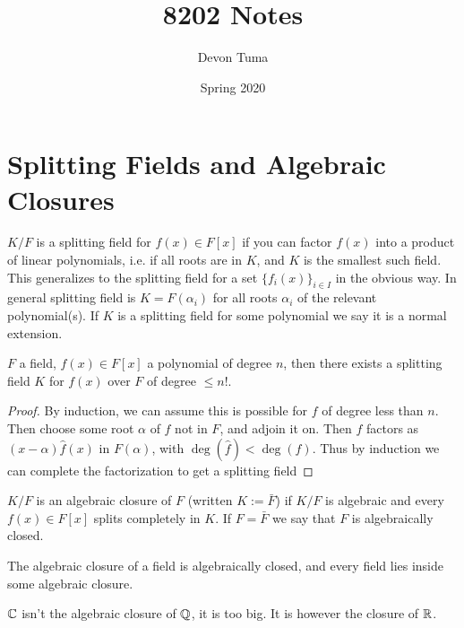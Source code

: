 \documentclass[11pt]{article}
\title{8202 Notes}
\author{Devon Tuma}
\date{Spring 2020}
\begin{document}
\maketitle

\section*{Splitting Fields and Algebraic Closures}

\begin{definition}
  $K/F$ is a splitting field for $f(x) \in F[x]$ if you can factor $f(x)$ into a product of linear polynomials, i.e. if all roots are in $K$, and $K$ is the smallest such field.
  This generalizes to the splitting field for a set $\{f_i(x)\}_{i \in I}$ in the obvious way.
  In general splitting field is $K = F(\alpha_i)$ for all roots $\alpha_i$ of the relevant polynomial(s).
  If $K$ is a splitting field for some polynomial we say it is a normal extension.
\end{definition}

\begin{theorem}
  $F$ a field, $f(x) \in F[x]$  a polynomial of degree $n$, then there exists a splitting field $K$ for $f(x)$ over $F$ of degree $\le n!$.
\end{theorem}

\begin{proof}
  By induction, we can assume this is possible for $f$ of degree less than $n$.
  Then choose some root $\alpha$ of $f$ not in $F$, and adjoin it on.
  Then $f$ factors as $(x - \alpha)\hat{f}(x)$ in $F(\alpha)$, with $\deg(\hat{f}) < \deg(f)$.
  Thus by induction we can complete the factorization to get a splitting field
\end{proof}

\begin{definition}
  $K/F$ is an algebraic closure of $F$ (written $K := \bar{F}$) if $K/F$ is algebraic and every $f(x) \in F[x]$ splits completely in $K$.
  If $F = \bar{F}$ we say that $F$ is algebraically closed.
\end{definition}

\begin{theorem}
  The algebraic closure of a field is algebraically closed, and every field lies inside some algebraic closure.
\end{theorem}

\begin{remark}
  $\mathbb{C}$ isn't the algebraic closure of $\mathbb{Q}$, it is too big. It is however the closure of $\mathbb{R}$.
\end{remark}
\end{document}

